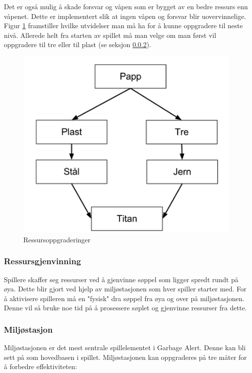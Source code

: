 Det er også mulig å skade forsvar og våpen som er bygget av en bedre ressurs enn våpenet. Dette er implementert slik at ingen våpen og forsvar blir uovervinnelige. Figur \ref{fig:ressursoppgraderinger} framstiller hvilke utvidelser man må ha for å kunne oppgradere til neste nivå. Allerede helt fra starten av spillet må man velge om man først vil oppgradere til tre eller til plast (se seksjon \ref{miljostasjon}). 

\begin{figure} [H]
	\begin{center}
	\includegraphics[scale=0.5]{images/oppgraderingstre}
	\end{center}
	\caption{Ressursoppgraderinger}
	\label{fig:ressursoppgraderinger}
\end{figure}

\subsubsection{Ressursgjenvinning}
Spillere skaffer seg ressurser ved å gjenvinne søppel som ligger
spredt rundt på øya. Dette blir gjort ved hjelp av miljøstasjonen
som hver spiller starter med. For å aktivisere spilleren må en "fysisk" dra søppel fra øya og over på miljøstasjonen. Denne vil så bruke noe tid på å prosessere søplet og gjenvinne ressurser fra dette.


\subsubsection{Miljøstasjon} \label{miljostasjon}
Miljøstasjonen er det mest sentrale spillelementet i Garbage
Alert. Denne kan bli sett på som hovedbasen i spillet.
Miljøstasjonen kan oppgraderes på tre måter for å forbedre effektiviteten:

